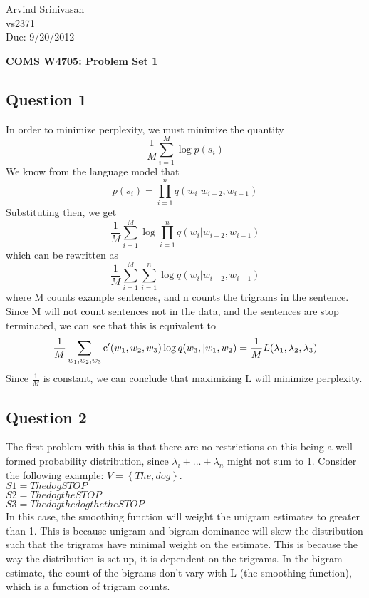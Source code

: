 \documentclass[11pt]{article}
\begin{document}
\large Arvind Srinivasan \\
vs2371 \\
Due: 9/20/2012 \\
\centerline{\Large {\bf COMS W4705: Problem Set 1}}

\subsection*{Question 1}
In order to minimize perplexity, we must minimize the quantity \[ \frac{1}{M}\sum_{i=1}^{M} \log p(s_i) \]
We know from the language model that \[ p(s_i) = \prod_{i=1}^{n} q(w_i | w_{i-2}, w_{i-1}) \]
Substituting then, we get \[ \frac{1}{M}\sum_{i=1}^{M} \log \prod_{i=1}^{n} q(w_i | w_{i-2}, w_{i-1})\] 
which can be rewritten as \[ \frac{1}{M}\sum_{i=1}^{M} \sum _{i=1}^{n} \log q(w_i | w_{i-2}, w_{i-1})\]
where M counts example sentences, and n counts the trigrams in the sentence. Since M will not count sentences not in the data, and the sentences are stop terminated, we can see that this is equivalent to \[ \frac{1}{M}\sum_{w_1, w_2, w_3} \hbox{c}'(w_1, w_2, w_3)
\log q(w_3, | w_1, w_2) = \frac{1}{M}L(\lambda_1, \lambda_2, \lambda_3)\] Since $\frac{1}{M}$ is constant, we can conclude that maximizing L will minimize perplexity.

\subsection*{Question 2}

    
The first  problem with this is that there are no restrictions on this being a well formed probability distribution, since  $\lambda_i + ... + \lambda_n$ might not sum to 1. Consider the following example: 
$V = \left\{{The, dog}\right\}.$ \\
$S1 = The dog STOP $ \\
$S2 = The dog the STOP $ \\ 
$S3 = The dog the dog the the STOP$ \\

In this case, the smoothing function will weight the unigram estimates to greater than 1. This is because unigram and bigram dominance will skew the distribution such that the trigrams have minimal weight on the estimate. This is because the way the distribution is set up, it is dependent on the trigrams. In the bigram estimate, the count of the bigrams don't vary with L (the smoothing function), which is a function of trigram counts. 
\end{document}
